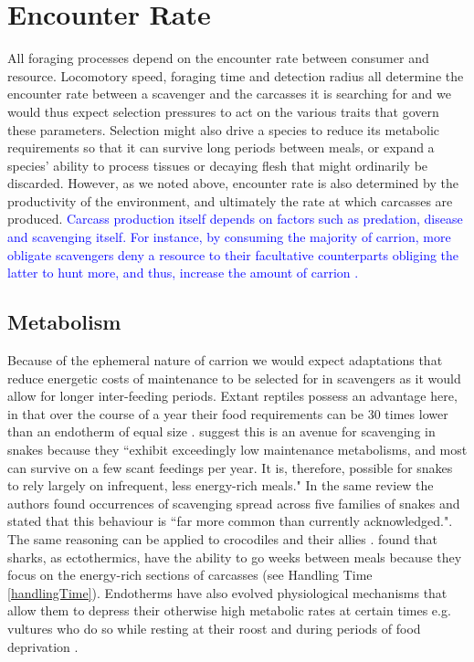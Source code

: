 \documentclass[a4paper,12pt]{article}
\begin{document}
\section{Encounter Rate}
All foraging processes depend on the encounter rate between consumer and resource. 
Locomotory speed, foraging time and detection radius all determine the encounter rate between a scavenger and the carcasses it is searching for and we would thus expect selection pressures to act on the various traits that govern these parameters.
Selection might also drive a species to reduce its metabolic requirements so that it can survive long periods between meals, or expand a species' ability to process tissues or decaying flesh that might ordinarily be discarded.
However, as we noted above, encounter rate is also determined by the productivity of the environment, and ultimately the rate at which carcasses are produced. 
\textcolor{blue}{Carcass production itself depends on factors such as predation, disease and scavenging itself. For instance, by consuming the majority of carrion, more obligate scavengers deny a resource to their facultative counterparts obliging the latter to hunt more, and thus, increase the amount of carrion \citep{moleon2014inter}.}

\subsection{Metabolism}
Because of the ephemeral nature of carrion \citep{devault2003scavenging,ruxton2004obligate} we would expect adaptations that reduce energetic costs of maintenance to be selected for in scavengers as it would allow for longer inter-feeding periods. 
Extant reptiles possess an advantage here, in that over the course of a year their food requirements can be 30 times lower than an endotherm of equal size \citep{Nagy1621}.
\cite{devault2002scavenging} suggest this is an avenue for scavenging in snakes because they ``exhibit exceedingly low maintenance metabolisms, and most can survive on a few scant feedings per year.
It is, therefore, possible for snakes to rely largely on infrequent, less energy-rich meals."
In the same review the authors found occurrences of scavenging spread across five families of snakes and stated that this behaviour is ``far more common than currently acknowledged."\citep{devault2002scavenging}.
The same reasoning can be applied to crocodiles and their allies \citep{forrest2003evidence,moleon2015carcass}. 
\cite{carey1982temperature} found that sharks, as ectothermics, have the ability to go weeks between meals because they focus on the energy-rich sections of carcasses (see Handling Time \ref{handlingTime}). 
Endotherms have also evolved physiological mechanisms that allow them to depress their otherwise high metabolic rates at certain times e.g. vultures who do so while resting at their roost and during periods of food deprivation \citep{bahat1998nocturnal}.
\end{document}
